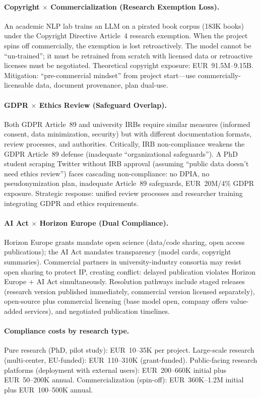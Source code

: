 \documentclass[11pt,a4paper]{article}
\begin{document}
\paragraph{Copyright $\times$ Commercialization (Research Exemption Loss).} An academic NLP lab trains an LLM on a pirated book corpus (183K books) under the Copyright Directive Article~4 research exemption. When the project spins off commercially, the exemption is lost retroactively. The model cannot be ``un-trained''; it must be retrained from scratch with licensed data or retroactive licenses must be negotiated. Theoretical copyright exposure: EUR~91.5M--9.15B. Mitigation: ``pre-commercial mindset'' from project start---use commercially-licensable data, document provenance, plan dual-use.

\paragraph{GDPR $\times$ Ethics Review (Safeguard Overlap).} Both GDPR Article~89 and university IRBs require similar measures (informed consent, data minimization, security) but with different documentation formats, review processes, and authorities. Critically, IRB non-compliance weakens the GDPR Article~89 defense (inadequate ``organizational safeguards''). A PhD student scraping Twitter without IRB approval (assuming ``public data doesn't need ethics review'') faces cascading non-compliance: no DPIA, no pseudonymization plan, inadequate Article~89 safeguards, EUR~20M/4\% GDPR exposure. Strategic response: unified review processes and researcher training integrating GDPR and ethics requirements.

\paragraph{AI Act $\times$ Horizon Europe (Dual Compliance).} Horizon Europe grants mandate open science (data/code sharing, open access publications); the AI Act mandates transparency (model cards, copyright summaries). Commercial partners in university-industry consortia may resist open sharing to protect IP, creating conflict: delayed publication violates Horizon Europe + AI Act simultaneously. Resolution pathways include staged releases (research version published immediately, commercial version licensed separately), open-source plus commercial licensing (base model open, company offers value-added services), and negotiated publication timelines.

\paragraph{Compliance costs by research type.} Pure research (PhD, pilot study): EUR~10--35K per project. Large-scale research (multi-center, EU-funded): EUR~110--310K (grant-funded). Public-facing research platforms (deployment with external users): EUR~200--660K initial plus EUR~50--200K annual. Commercialization (spin-off): EUR~360K--1.2M initial plus EUR~100--500K annual.
\end{document}
